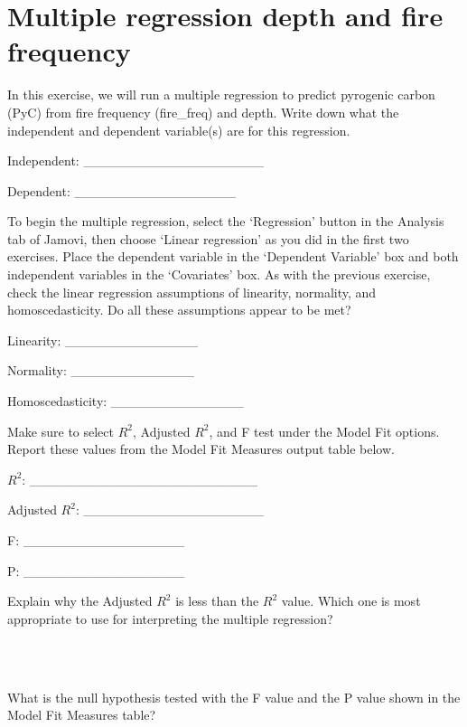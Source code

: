 \documentclass[
]{scrbook}
\begin{document}
\hypertarget{multiple-regression-depth-and-fire-frequency}{%
\section{Multiple regression depth and fire frequency}\label{multiple-regression-depth-and-fire-frequency}}

In this exercise, we will run a multiple regression to predict pyrogenic carbon (PyC) from fire frequency (fire\_freq) and depth.
Write down what the independent and dependent variable(s) are for this regression.

Independent: \_\_\_\_\_\_\_\_\_\_\_\_\_\_\_\_\_\_\_

Dependent: \_\_\_\_\_\_\_\_\_\_\_\_\_\_\_\_\_

To begin the multiple regression, select the `Regression' button in the Analysis tab of Jamovi, then choose `Linear regression' as you did in the first two exercises.
Place the dependent variable in the `Dependent Variable' box and both independent variables in the `Covariates' box.
As with the previous exercise, check the linear regression assumptions of linearity, normality, and homoscedasticity.
Do all these assumptions appear to be met?

Linearity: \_\_\_\_\_\_\_\_\_\_\_\_\_\_

Normality: \_\_\_\_\_\_\_\_\_\_\_\_\_

Homoscedasticity: \_\_\_\_\_\_\_\_\_\_\_\_\_\_

Make sure to select \(R^{2}\), Adjusted \(R^{2}\), and F test under the Model Fit options.
Report these values from the Model Fit Measures output table below.

\(R^{2}\): \_\_\_\_\_\_\_\_\_\_\_\_\_\_\_\_\_\_\_\_\_\_\_\_

Adjusted \(R^{2}\): \_\_\_\_\_\_\_\_\_\_\_\_\_\_\_\_\_\_\_

F: \_\_\_\_\_\_\_\_\_\_\_\_\_\_\_\_\_

P: \_\_\_\_\_\_\_\_\_\_\_\_\_\_\_\_\_

Explain why the Adjusted \(R^{2}\) is less than the \(R^{2}\) value.
Which one is most appropriate to use for interpreting the multiple regression?

\begin{verbatim}



\end{verbatim}

What is the null hypothesis tested with the F value and the P value shown in the Model Fit Measures table?
\end{document}

